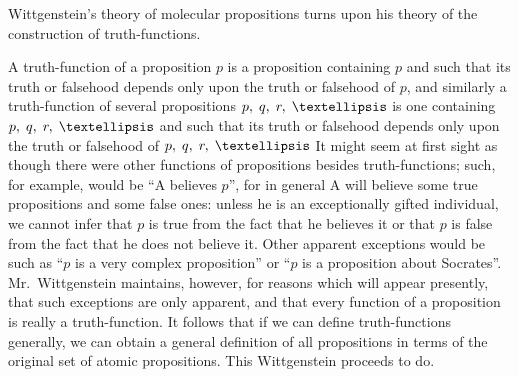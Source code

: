 Wittgenstein’s theory of molecular propositions turns upon his theory of the construction of truth-functions.

A truth-function of a proposition $p$ is a proposition containing $p$ and such that its truth or falsehood depends only upon the truth or falsehood of $p$, and similarly a truth-function of several propositions $p,\thickspace q,\thickspace r,\thickspace …$ is one containing $p,\thickspace q,\thickspace r,\thickspace …$ and such that its truth or falsehood depends only upon the truth or falsehood of $p,\thickspace q,\thickspace r,\thickspace …$ It might seem at first sight as though there were other functions of propositions besides truth-functions; such, for example, would be “A believes $p$”, for in general A will believe some true propositions and some false ones: unless he is an exceptionally gifted individual, we cannot infer that $p$ is true from the fact that he believes it or that $p$ is false from the fact that he does not believe it. Other apparent exceptions would be such as “$p$ is a very complex proposition” or “$p$ is a proposition about Socrates”. Mr.\ Wittgenstein maintains, however, for reasons which will appear presently, that such exceptions are only apparent, and that every function of a proposition is really a truth-function. It follows that if we can define truth-functions generally, we can obtain a general definition of all propositions in terms of the original set of atomic propositions. This Wittgenstein proceeds to do.

